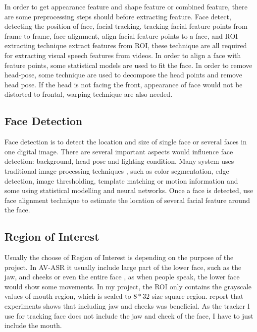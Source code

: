 In order to get appearance feature and shape feature or combined feature, there are some preprocessing steps should before extracting feature. Face detect, detecting the position of face, facial tracking, tracking facial feature points from frame to frame, face alignment, align facial feature points to a face, and ROI extracting technique extract features from ROI, these technique are all required for extracting visual speech features from videos. In order to align a face with feature points, some statistical models are used to fit the face. In order to remove head-pose, some technique are used to decompose the head points and remove head pose. If the head is not facing the front, appearance of face would not be distorted to frontal, warping technique are also needed.
\subsection{Face Detection}
Face detection is to detect the location and size of single face or several faces in one digital image. There are several important aspects would influence face detection: background, head pose and lighting condition. Many system uses traditional image processing techniques\cite{potamianos2003recent} , such as color segmentation, edge detection, image thresholding, template matching or motion information and some using statistical modelling and neural networks. Once a face is detected, use face alignment technique to estimate the location of several facial feature around the face.
\subsection{Region of Interest}
Usually the choose of Region of Interest is depending on the purpose of the project. In AV-ASR it usually include large part of the lower face, such as the jaw, and cheeks or even the entire face \cite{potamianos2003recent}, as when people speak, the lower face would show some movements. In my project, the ROI only contains the grayscale values of mouth region, which is scaled to $8 * 32$ size square region. \cite{potamianos2003recent} report that experiments shows that including jaw and cheeks was beneficial. As the tracker I use for tracking face does not include the jaw and cheek of the face, I have to just include the mouth.
